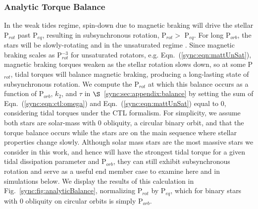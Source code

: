 \subsubsection{Analytic Torque Balance} \label{sync:sec:analytic}

In the weak tides regime, spin-down due to magnetic braking will drive the stellar P$_{rot}$ past P$_{eq}$, resulting in subsynchronous rotation, P$_{rot} >$ P$_{eq}$. For long P$_{orb}$, the stars will be slowly-rotating and in the unsaturated regime \citep{Matt2015}. Since magnetic braking scales as P$_{rot}^{-3}$ for unsaturated rotators, e.g. Eqn.~(\ref{sync:eqn:mattUnSat}), magnetic braking torques weaken as the stellar rotation slows down, so at some P$_{rot}$, tidal torques will balance magnetic braking, producing a long-lasting state of subsynchronous rotation. We compute the P$_{rot}$ at which this balance occurs as a function of P$_{orb}$, $k_2$, and $\tau$ in $\S$~\ref{sync:sec:appendix:balance} by setting the sum of Eqn.~(\ref{sync:eqn:ctl:omega}) and Eqn.~(\ref{sync:eqn:mattUnSat}) equal to 0, considering tidal torques under the CTL formalism. For simplicity, we assume both stars are solar-mass with 0 obliquity, a circular binary orbit, and that the torque balance occurs while the stars are on the main sequence where stellar properties change slowly. Although solar mass stars are the most massive stars we consider in this work, and hence will have the strongest tidal torque for a given tidal dissipation parameter and P$_{orb}$, they can still exhibit subsynchronous rotation and serve as a useful end member case to examine here and in simulations below.  We display the results of this calculation in Fig.~\ref{sync:fig:analyticBalance}, normalizing P$_{rot}$ by P$_{eq}$, which for binary stars with 0 obliquity on circular orbits is simply P$_{orb}$.


